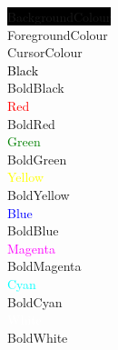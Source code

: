 \documentclass{article}
\begin{document}
\colorbox{Black}{\textcolor{BackgroundColour}{BackgroundColour}}\\
\textcolor{ForegroundColour}{ForegroundColour}\\
\textcolor{CursorColour}{CursorColour}\\
\textcolor{Black}{Black}\\
\textcolor{BoldBlack}{BoldBlack}\\
\textcolor{Red}{Red}\\
\textcolor{BoldRed}{BoldRed}\\
\textcolor{Green}{Green}\\
\textcolor{BoldGreen}{BoldGreen}\\
\textcolor{Yellow}{Yellow}\\
\textcolor{BoldYellow}{BoldYellow}\\
\textcolor{Blue}{Blue}\\
\textcolor{BoldBlue}{BoldBlue}\\
\textcolor{Magenta}{Magenta}\\
\textcolor{BoldMagenta}{BoldMagenta}\\
\textcolor{Cyan}{Cyan}\\
\textcolor{BoldCyan}{BoldCyan}\\
\textcolor{White}{White}\\
\textcolor{BoldWhite}{BoldWhite}
\end{document}
